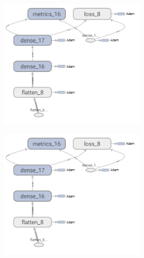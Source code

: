 \begin{figure}
	\centering
	\begin{subfigure}[b]{0.3\linewidth}
		\begin{subfigure}[b]{\linewidth}
			\includegraphics[width=\linewidth]{plots/rnn-candidates-placeholder.png}
		\end{subfigure}
		\begin{subfigure}[b]{\linewidth}
			\includegraphics[width=\linewidth]{plots/rnn-candidates-placeholder.png}

\end{subfigure}
\end{subfigure}
\end{figure}
